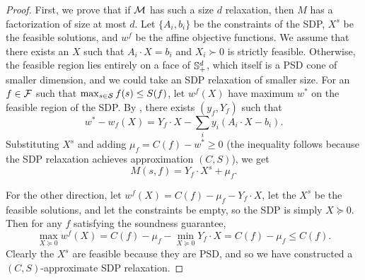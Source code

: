 \begin{proof}
First, we prove that if $\mathcal M$ has such a size $d$ relaxation, then $M$ has a factorization of size at most $d$. Let $\{A_i, b_i\}$ be the constraints of the SDP, $X^s$ be the feasible solutions, and $w^f$ be the affine objective functions. We assume that there exists an $X$ such that $A_i \cdot X = b_i$ and $X_i \succ 0$ is strictly feasible. Otherwise, the feasible region lies entirely on a face of $\mathbb{S}^{d}_+$, which itself is a PSD cone of smaller dimension, and we could take an SDP relaxation of smaller size. For an $f \in \mathcal F$ such that $\max_{s \in \mathcal S} f(s) \leq S(f)$, let $w^f(X)$ have maximum $w^*$ on the feasible region of the SDP. By , there exists $(y_f, Y_f)$ such that 
\[w^* - w_f(X) = Y_f \cdot X - \sum_i y_i(A_i \cdot X - b_i).\]
Substituting $X^s$ and adding $\mu_f = C(f) - w^* \geq 0$ (the inequality follows because the SDP relaxation achieves approximation $(C,S)$), we get
\[M(s,f) = Y_f \cdot X^s + \mu_f.\]

For the other direction, let $w^f(X) = C(f) - \mu_f - Y_f \cdot X$, let the $X^s$ be the feasible solutions, and let the constraints be empty, so the SDP is simply $X \succeq 0$. Then for any $f$ satisfying the soundness guarantee, 
\[\max_{X \succeq 0} w^f(X) = C(f) - \mu_f - \min_{X \succeq 0} Y_f \cdot X = C(f) - \mu_f \leq C(f).\]
Clearly the $X^s$ are feasible because they are PSD, and so we have constructed a $(C,S)$-approximate SDP relaxation.
\end{proof}

